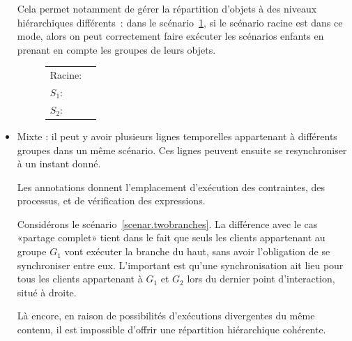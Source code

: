 \documentclass{article}
\newcommand\trigger{point d'interaction\xspace}
\begin{document}
\begin{itemize}
    Cela permet notamment de gérer la répartition d'objets à des niveaux hiérarchiques différents~: dans le scénario~\ref{scenar.hierarchy}, si le scénario racine est dans ce mode, alors on peut correctement faire exécuter les scénarios enfants en prenant en compte les groupes de leurs objets. 
    
    \begin{figure}[h]
        \centering
        \begin{tabular}{L{3.5em}R{0.3\textwidth}}
            Racine: & \begin{tikzpicture}
            
            \end{tikzpicture} \\
            $S_1$: & \begin{tikzpicture}[scale=0.4, every node/.style={scale=0.6}]
            
            \end{tikzpicture} \\
            $S_2$: & \begin{tikzpicture}[scale=0.6, every node/.style={scale=0.6}]
            
            \end{tikzpicture} \\
        \end{tabular}
        \label{scenar.hierarchy}
    \end{figure}
    
    \item Mixte : il peut y avoir plusieurs lignes temporelles appartenant à différents groupes dans un même scénario. Ces lignes peuvent ensuite se resynchroniser à un instant donné. 
    
    Les annotations donnent l'emplacement d'exécution des contraintes, des processus, et de vérification des expressions. 
    
    Considérons le scénario~\ref{scenar.twobranches}. 
    La différence avec le cas «partage complet» tient dans le fait que seuls les clients appartenant au groupe $G_1$ vont exécuter la branche du haut, sans avoir l'obligation de se synchroniser entre eux. 
    L'important est qu'une synchronisation ait lieu pour tous les clients appartenant à $G_1$ et $G_2$ lors du dernier \trigger, situé à droite.
    
    Là encore, en raison de possibilités d'exécutions divergentes du même contenu, il est impossible d'offrir une répartition hiérarchique cohérente.
    

\end{itemize}
\end{document}
